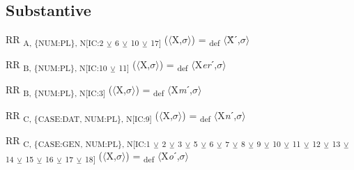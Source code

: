 {\subsection{Substantive}

\begin{exe}
 RR \textsubscript{A, \{NUM:PL\}, N[IC:2} \textsubscript{${\veebar}$}\textsubscript{ 6} \textsubscript{${\veebar}$}\textsubscript{ 10} \textsubscript{${\veebar}$}\textsubscript{ 17]} ($\langle$X,$\sigma $$\rangle$) = \textsubscript{def} $\langle$Ẍˊ,$\sigma $$\rangle$
\end{exe}

\begin{exe}
 RR \textsubscript{B, \{NUM:PL\}, N[IC:10} \textsubscript{${\veebar}$}\textsubscript{ 11]} ($\langle$X,$\sigma $$\rangle$) = \textsubscript{def} $\langle$X\textit{er}ˊ,$\sigma $$\rangle$
\end{exe}

\begin{exe}
 RR \textsubscript{B, \{NUM:PL\}, N[IC:3]} ($\langle$X,$\sigma $$\rangle$) = \textsubscript{def} $\langle$X\textit{m}ˊ,$\sigma $$\rangle$
\end{exe}

\begin{exe}
 RR \textsubscript{C, \{CASE:DAT, NUM:PL\}, N[IC:9]} ($\langle$X,$\sigma $$\rangle$) = \textsubscript{def} $\langle$X\textit{n}ˊ,$\sigma $$\rangle$
\end{exe}

\begin{exe}
 RR \textsubscript{C, \{CASE:GEN, NUM:PL\}, N[IC:1} \textsubscript{${\veebar}$}\textsubscript{ 2} \textsubscript{${\veebar}$}\textsubscript{ 3} \textsubscript{${\veebar}$}\textsubscript{ 5} \textsubscript{${\veebar}$}\textsubscript{ 6} \textsubscript{${\veebar}$}\textsubscript{ 7} \textsubscript{${\veebar}$}\textsubscript{ 8} \textsubscript{${\veebar}$}\textsubscript{ 9} \textsubscript{${\veebar}$}\textsubscript{ 10} \textsubscript{${\veebar}$}\textsubscript{ 11} \textsubscript{${\veebar}$}\textsubscript{ 12} \textsubscript{${\veebar}$}\textsubscript{ 13} \textsubscript{${\veebar}$}\textsubscript{ 14} \textsubscript{${\veebar}$}\textsubscript{ 15} \textsubscript{${\veebar}$}\textsubscript{ 16} \textsubscript{${\veebar}$}\textsubscript{ 17} \textsubscript{${\veebar}$}\textsubscript{ 18]} ($\langle$X,$\sigma $$\rangle$) = \textsubscript{def} $\langle$X\textit{o}ˊ,$\sigma $$\rangle$
\end{exe}

}

